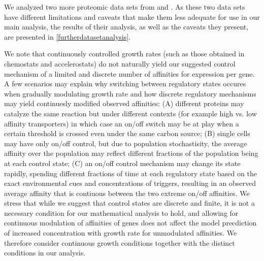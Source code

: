 \documentclass{article}
\begin{document}
We analyzed two more proteomic data sets from \cite{Valgepea2013} and \cite{Hui_2015}.
As these two data sets have different limitations and caveats that make them less adequate for use in our main analysis, the results of their analysis, as well as the caveats they present, are presented in \ref{furtherdatasetanalysis}.

We note that continuously controlled growth rates (such as those obtained in chemostats and accelerostats) do not naturally yield our suggested control mechanism of a limited and discrete number of affinities for expression per gene.
A few scenarios may explain why switching between regulatory states occures when gradually modulating growth rate and how discrete regulatory mechanisms may yield continuesly modified observed affinities: 
(A) different proteins may catalyze the same reaction but under different contexts (for example high vs. low affinity transporters) in which case an on/off switch may be at play when a certain threshold is crossed even under the same carbon source; 
(B) single cells may have only on/off control, but due to population stochastisity, the average affinity over the population may reflect different fractions of the population being at each control state; 
(C) an on/off control mechanism may change its state rapidly, spending different fractions of time at each regulatory state based on the exact environmental cues and concentrations of triggers, resulting in an observed average affinity that is contiuous between the two extreme on/off affinities.
We stress that while we suggest that control states are discrete and finite, it is not a necessary condition for our mathematical analysis to hold, and allowing for continuous modulation of affinities of genes does not affect the model precdiction of increased concentration with growth rate for unmodulated affinities.
We therefore consider continuous growth conditions together with the distinct conditions in our analysis.
\end{document}
